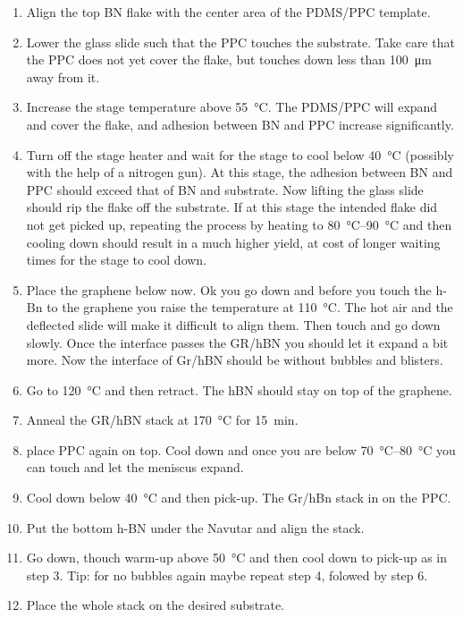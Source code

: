 \begin{enumerate}
	\item Align the top BN flake with the center area of the PDMS/PPC template.
	\item Lower the glass slide such that the PPC touches the substrate.
	Take care that the PPC does not yet cover the flake, but touches down less than \SI{100}{\micro\meter} away from it.
	\item Increase the stage temperature above \SI{55}{\celsius}.
	The PDMS/PPC will expand and cover the flake, and adhesion between BN and PPC increase significantly.
	\item Turn off the stage heater and wait for the stage to cool below \SI{40}{\celsius} (possibly with the help of a nitrogen gun).
	At this stage, the adhesion between BN and PPC should exceed that of BN and substrate.
	Now lifting the glass slide should rip the flake off the substrate.
	If at this stage the intended flake did not get picked up, repeating the process by heating to \SIrange{80}{90}{\celsius} and then cooling down should result in a much higher yield, at cost of longer waiting times for the stage to cool down.
	\item Place the graphene below now. Ok you go down and before you touch the h-Bn to the graphene you raise the temperature at \SI{110}{\celsius}. The hot air and the deflected slide will make it difficult to align them. Then touch and go down slowly. Once the interface passes the GR/hBN you should let it expand a bit more. Now the interface of Gr/hBN should be without bubbles and blisters.
	\item Go to \SI{120}{\celsius} and then retract. The hBN should stay on top of the graphene.
	\item Anneal the GR/hBN stack at \SI{170}{\celsius} for \SI{15}{\minute}.
	\item place PPC again on top. Cool down and once you are below \SIrange{70}{80}{\celsius} you can touch and let the meniscus expand. 
	\item Cool down below \SI{40}{\celsius} and then pick-up. The Gr/hBn stack in on the PPC.
	\item Put the bottom h-BN under the Navutar and align the stack.
	\item Go down, thouch warm-up above \SI{50}{\celsius} and then cool down to pick-up as in step 3. Tip: for no bubbles again maybe repeat step 4, folowed by step 6.
	\item Place the whole stack on the desired substrate.
\end{enumerate}

